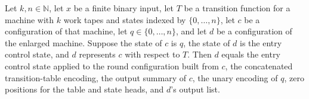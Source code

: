 \begin{lemma}
\label{Turing.StepBlock.rep_entry}
\leanok
{}
Let $k,n\in\mathbb N$, let $x$ be a finite binary input, let $T$ be a transition
function for a machine with $k$ work tapes and states indexed by $\{0,\ldots,n\}$, let
$c$ be a configuration of that machine, let $q\in\{0,\ldots,n\}$, and let $d$ be a
configuration of the enlarged machine. Suppose the state of $c$ is $q$, the state of $d$
is the entry control state, and $d$ represents $c$ with respect to $T$. Then $d$ equals
the entry control state applied to the round configuration built from $c$, the
concatenated transition-table encoding, the output summary of $c$, the unary encoding of
$q$, zero positions for the table and state heads, and $d$'s output list.
\end{lemma}

